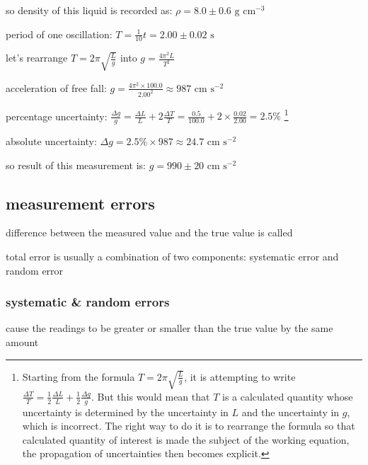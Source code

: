 so density of this liquid is recorded as: $\rho = 8.0 \pm 0.6 \text{ g cm}^{-3}$ \eoe


\sol period of one oscillation: $T = \frac{1}{10}t = 2.00 \pm 0.02 \text{ s}$

let's rearrange $T=2\pi\sqrt{\frac{L}{g}}$ into $g = \frac{4\pi^2L}{T^2}$

acceleration of free fall: $g = \frac{4\pi^2 \times 100.0}{2.00^2} \approx 987 \text{ cm s}^{-2}$

\eqyskip percentage uncertainty: $\frac{\Delta g}{g} = \frac{\Delta L}{L} + 2\frac{\Delta T}{T} = \frac{0.5}{100.0} + 2\times\frac{0.02}{2.00} = 2.5\%$ \footnote{Starting from the formula $T=2\pi\sqrt{\frac{L}{g}}$, it is attempting to write $\frac{\Delta T}{T} = \frac{1}{2}\frac{\Delta L}{L} + \frac{1}{2}\frac{\Delta g}{g}$. But this would mean that $T$ is a calculated quantity whose uncertainty is determined by the uncertainty in $L$ and the uncertainty in $g$, which is incorrect. The right way to do it is to rearrange the formula so that calculated quantity of interest is made the subject of the working equation, the propagation of uncertainties then becomes explicit.}

absolute uncertainty: $\Delta g = 2.5\% \times 987 \approx 24.7 \text{ cm s}^{-2}$

so result of this measurement is: $ g = 990 \pm 20 \text{ cm s}^{-2}$ \eoe




\subsection{measurement errors}

difference between the measured value and the true value is called 

total error is usually a combination of two components: systematic error and random error

\subsubsection{systematic \& random errors}

\begin{ilight}
	 cause the readings to be greater or smaller than the true value by the same amount
\end{ilight}

